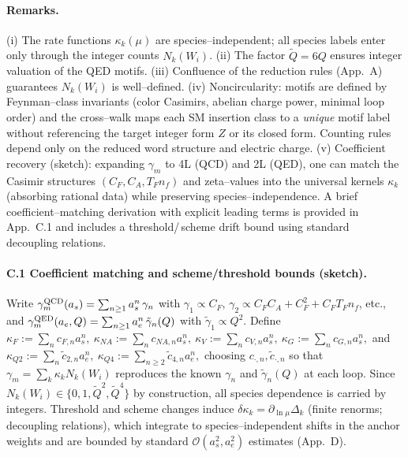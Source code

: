 \documentclass[epjc3]{svjour3}
\begin{document}
\paragraph{Remarks.}
(i) The rate functions $\kappa_k(\mu)$ are species–independent; all species labels enter only through the integer counts $N_k(W_i)$. (ii) The factor $\tilde Q=6Q$ ensures integer valuation of the QED motifs. (iii) Confluence of the reduction rules (App.~A) guarantees $N_k(W_i)$ is well–defined. (iv) Noncircularity: motifs are defined by Feynman--class invariants (color Casimirs, abelian charge power, minimal loop order) and the cross--walk maps each SM insertion class to a \emph{unique} motif label without referencing the target integer form $Z$ or its closed form. Counting rules depend only on the reduced word structure and electric charge. (v) Coefficient recovery (sketch): expanding $\gamma_m$ to 4L (QCD) and 2L (QED), one can match the Casimir structures $(C_F, C_A, T_F n_f)$ and zeta--values into the universal kernels $\kappa_k$ (absorbing rational data) while preserving species--independence. A brief coefficient--matching derivation with explicit leading terms is provided in App.~C.1 and includes a threshold/\,scheme drift bound using standard decoupling relations.

\paragraph{C.1 Coefficient matching and scheme/threshold bounds (sketch).}
Write $\gamma_m^{\rm QCD}(a_s)=\sum_{n\ge1} a_s^n\,\gamma_n$ with $\gamma_1\propto C_F$, $\gamma_2\propto C_F C_A + C_F^2 + C_F T_F n_f$, etc., and $\gamma_m^{\rm QED}(a_e,Q)=\sum_{n\ge1} a_e^n\,\tilde\gamma_n(Q)$ with $\tilde\gamma_1\propto Q^2$. Define
\(
\kappa_F:= \sum_n c_{F,n} a_s^n,\ \kappa_{NA}:=\sum_n c_{NA,n} a_s^n,\ \kappa_V:=\sum_n c_{V,n} a_s^n,\ \kappa_G:=\sum_n c_{G,n} a_s^n,
\)
and
\(
\kappa_{Q2}:= \sum_n \tilde c_{2,n} a_e^n,\ \kappa_{Q4}:= \sum_{n\ge2} \tilde c_{4,n} a_e^n,
\)
choosing $c_{\cdot,n},\tilde c_{\cdot,n}$ so that $\gamma_m=\sum_k \kappa_k N_k(W_i)$ reproduces the known $\gamma_n$ and $\tilde\gamma_n(Q)$ at each loop. Since $N_k(W_i)\in\{0,1,\tilde Q^2,\tilde Q^4\}$ by construction, all species dependence is carried by integers. Threshold and scheme changes induce $\delta\kappa_k=\partial_{\ln\mu}\Delta_k$ (finite renorms; decoupling relations), which integrate to species–independent shifts in the anchor weights and are bounded by standard $\mathcal O(a_s^2,a_e^2)$ estimates (App.~D).
\end{document}
